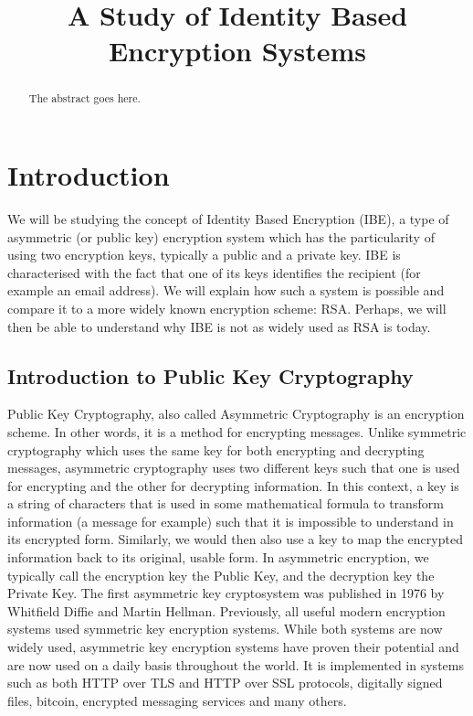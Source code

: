 \documentclass[conference]{IEEEtran}
\begin{document}
\title{A Study of Identity Based Encryption Systems}

\author{
}

\maketitle
\begin{abstract}
The abstract goes here.
\end{abstract}

\section{Introduction}
We will be studying the concept of Identity Based Encryption (IBE),
a type of asymmetric (or public key) encryption system which has the 
particularity of using two encryption keys, typically a public and a private key.
IBE is characterised with the fact that one of its keys identifies the recipient
(for example an email address). We will explain how such a system is possible
and compare it to a more widely known encryption scheme: RSA. Perhaps, we will
then be able to understand why IBE is not as widely used as RSA is today. 

\subsection{Introduction to Public Key Cryptography}
Public Key Cryptography, also called Asymmetric Cryptography is an 
encryption scheme. In other words, it is a method for encrypting messages.
Unlike symmetric cryptography which uses the same key for both encrypting and decrypting
messages, asymmetric cryptography uses two different keys such that one 
is used for encrypting and the other for decrypting information.
In this context, a key is a string of characters that is used in some mathematical
formula to transform information (a message for example) such that it is impossible to understand in its encrypted form. 
Similarly, we would then also use a key to map the encrypted information back to its original, usable form.
In asymmetric encryption, we typically call the encryption key
the Public Key, and the decryption key the Private Key.
The first asymmetric key cryptosystem was published in 1976 by Whitfield Diffie and Martin Hellman.
Previously, all useful modern encryption systems used symmetric key encryption systems. 
While both systems are now widely used, asymmetric key encryption systems 
have proven their potential and are now used on a daily basis throughout the world. It is implemented 
in systems such as both HTTP over TLS and HTTP over SSL protocols, digitally signed files, bitcoin,
encrypted messaging services and many others. 
\end{document}
